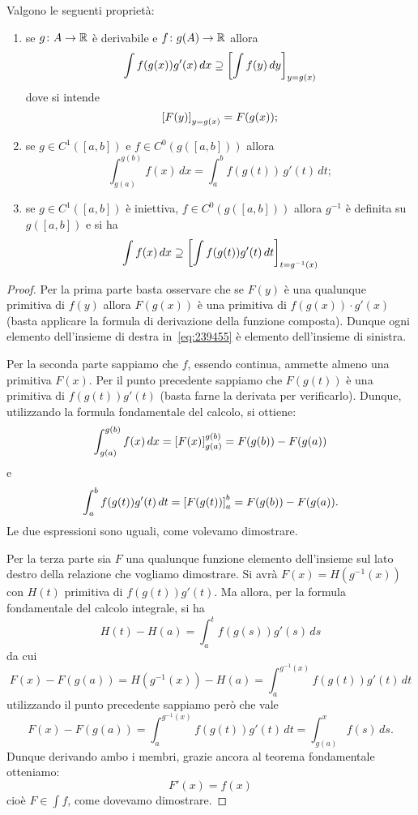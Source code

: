 \begin{theorem}
Valgono le seguenti proprietà:
\begin{enumerate}
\item
se $g\colon A \to {\mathbb R}$ è derivabile e $f\colon g(A) \to {\mathbb R}$
allora
%
%
\[
  \int f(g(x)) g'(x)\, dx \supseteq
  {\left[ \int f(y) \, dy \right]}_{y=g(x)}
\]
dove si intende
\[
 {\left[ F(y) \right]}_{y=g(x)} = F(g(x));
\]

\item
se $g\in C^1([a,b])$ e $f\in C^0(g([a,b]))$ allora
%
%
\[
 \int_{g(a)}^{g(b)} f(x)\, dx = \int_a^b f(g(t))\, g'(t)\, dt;
\]

\item
se $g\in C^1([a,b])$ è iniettiva, $f\in C^0(g([a,b]))$
allora $g^{-1}$ è definita su $g([a,b])$
e si ha
%
%
\begin{equation}\label{eq:239455}
  \int f(x)\, dx \supseteq {\left[ \int f(g(t)) g'(t)\, dt \right]}_{t=g^{-1}(x)}
\end{equation}
\end{enumerate}
\end{theorem}
%
\begin{proof}
Per la prima parte 
basta osservare che se $F(y)$ è una qualunque primitiva di $f(y)$ 
allora $F(g(x))$ è una primitiva di $f(g(x))\cdot g'(x)$
(basta applicare la formula di derivazione della funzione composta).
Dunque ogni elemento dell'insieme di destra in~\eqref{eq:239455}
è elemento dell'insieme di sinistra.

Per la seconda parte sappiamo che $f$, essendo continua, ammette almeno una
primitiva $F(x)$. Per il punto precedente sappiamo che $F(g(t))$ è una
primitiva di $f(g(t))g'(t)$ (basta farne la derivata per verificarlo).
Dunque, utilizzando la formula fondamentale del calcolo, si ottiene:
\[
\int_{g(a)}^{g(b)} f(x) \, dx
= {\left[ F(x) \right]}_{g(a)}^{g(b)}
= F(g(b)) - F(g(a))
\]
e
\[
\int_a^b f(g(t))g'(t)\, dt
= {\left[ F(g(t)) \right]}_a^b
= F(g(b)) - F(g(a)).
\]
Le due espressioni sono uguali, come volevamo dimostrare.

Per la terza parte
sia $F$ una qualunque funzione elemento dell'insieme sul lato destro della
relazione che vogliamo dimostrare.
Si avrà $F(x) = H(g^{-1}(x))$ con $H(t)$ primitiva
di $f(g(t))g'(t)$. Ma allora, per la formula fondamentale del calcolo integrale,
si ha
\[
  H(t)-H(a) = \int_a^t f(g(s)) g'(s)\, ds
\]
da cui
\[
  F(x) - F(g(a))
  = H(g^{-1}(x)) - H(a)
  = \int_a^{g^{-1}(x)} f(g(t)) g'(t)\, dt
\]
utilizzando il punto precedente sappiamo però che vale
\[
F(x) - F(g(a)) =
\int_a^{g^{-1}(x)} f(g(t)) g'(t)\, dt
= \int_{g(a)}^x f(s)\, ds.
\]
Dunque derivando ambo i membri, grazie ancora al teorema
fondamentale otteniamo:
\[
  F'(x) = f(x)
\]
cioè $F\in \int f$, come dovevamo dimostrare.
\end{proof}

